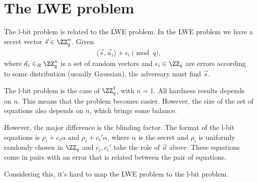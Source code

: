 \mode*

\section{The \acl*{LWE} problem}

The l-bit problem is related to the \ac{LWE} problem.
In the \ac{LWE} problem we have a secret vector \(\vec s \in \ZZ_q^n\).
Given
\begin{align*}
  \langle \vec s, \vec a_i\rangle + \epsilon_i \pmod q,
\end{align*}
where \(\vec a_i \in_R \ZZ_q^n\) is a set of random vectors and \(\epsilon_i 
\in \ZZ_q\) are errors according to some distribution (usually Gaussian), the 
adversary must find \(\vec s\).

The l-bit problem is the case of \(\ZZ_q^1\), \ie with \(n = 1\).
All hardness results depends on \(n\).
This means that the problem becomes easier.
However, the size of the set of equations also depends on \(n\), which brings 
some balance.

However, the major difference is the blinding factor.
The format of the l-bit equations is \(\rho_i + c_i\alpha\) and \(\rho_i + 
c_i'\alpha\), where \(\alpha\) is the secret and \(\rho_i\) is uniformly 
randomly chosen in \(\ZZ_q\) and \(c_i, c_i'\) take the role of \(\vec a\) 
above.
These equations come in pairs with an error that is related between the pair of 
equations.

Considering this, it's hard to map the \ac{LWE} problem to the l-bit problem.
